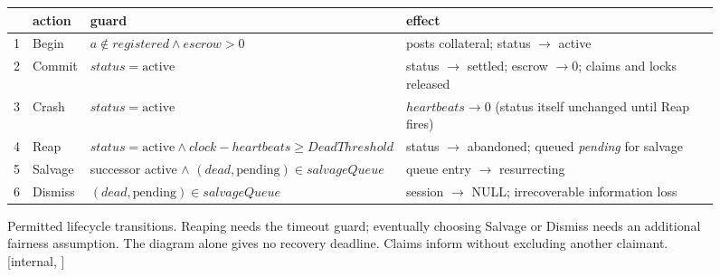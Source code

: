 \begin{figure}[H]
\medskip
{\footnotesize
\begin{tabularx}{\linewidth}{@{}c l >{\raggedright\arraybackslash}X >{\raggedright\arraybackslash}X@{}}
\toprule
 & action & guard & effect \\
\midrule
1 & Begin & $a\notin\mathit{registered} \wedge \mathit{escrow}>0$ & posts collateral; status $\to$ active \\
2 & Commit & $\mathit{status}=\text{active}$ & status $\to$ settled; escrow $\to 0$; claims and locks released \\
3 & Crash & $\mathit{status}=\text{active}$ & $\mathit{heartbeats}\to 0$ (status itself unchanged until Reap fires) \\
4 & Reap & $\mathit{status}=\text{active} \wedge \mathit{clock}-\mathit{heartbeats}\geq\mathit{DeadThreshold}$ & status $\to$ abandoned; queued \textit{pending} for salvage \\
5 & Salvage & successor active $\wedge$ $(\mathit{dead},\text{pending})\in\mathit{salvageQueue}$ & queue entry $\to$ resurrecting \\
6 & Dismiss & $(\mathit{dead},\text{pending})\in\mathit{salvageQueue}$ & session $\to$ NULL; irrecoverable information loss \\
\bottomrule
\end{tabularx}}
\caption{Permitted lifecycle transitions. Reaping needs the timeout guard;
eventually choosing Salvage or Dismiss needs an additional fairness assumption.
The diagram alone gives no recovery deadline. Claims inform without excluding
another claimant. [internal, \protect{}]}
\label{fig:bonded-session-lifecycle}
\end{figure}
